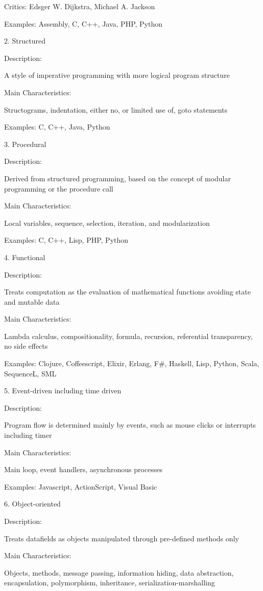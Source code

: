 Critics: Edsger W. Dijkstra, Michael A. Jackson

Examples: Assembly, C, C++, Java, PHP, Python

2. Structured

Description:

A style of imperative programming with more logical program structure

Main Characteristics:

Structograms, indentation, either no, or limited use of, goto statements

Examples: C, C++, Java, Python

3. Procedural

Description:

Derived from structured programming, based on the concept of modular programming or the procedure call

Main Characteristics:

Local variables, sequence, selection, iteration, and modularization

Examples: C, C++, Lisp, PHP, Python

4. Functional


Description:

Treats computation as the evaluation of mathematical functions avoiding state and mutable data

Main Characteristics:

Lambda calculus, compositionality, formula, recursion, referential transparency, no side effects

Examples: Clojure, Coffeescript, Elixir, Erlang, F#, Haskell, Lisp, Python, Scala, SequenceL, SML

5. Event-driven including time driven

Description:

Program flow is determined mainly by events, such as mouse clicks or interrupts including timer

Main Characteristics:

Main loop, event handlers, asynchronous processes

Examples: Javascript, ActionScript, Visual Basic

6. Object-oriented

Description:

Treats datafields as objects manipulated through pre-defined methods only

Main Characteristics:

Objects, methods, message passing, information hiding, data abstraction, encapsulation, polymorphism, inheritance, serialization-marshalling

